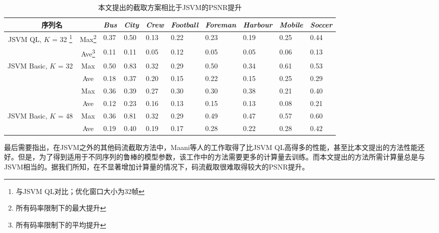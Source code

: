 \begin{table}[t]
	\centering
	\vspace{10pt}
	\caption{本文提出的截取方案相比于JSVM的PSNR提升}
	\label{tab:extraction-gain}
	\small
	\begin{minipage}{1.0\linewidth}
		\centering
		\begin{tabular}{c|c|*{3}{p{0.9cm}<{\centering}|}*{4}{p{1.1cm}<{\centering}|}p{0.9cm}<{\centering}}
			\hline \hline
			\multicolumn{2}{c|}{序列名} &
			{\em Bus} & {\em City} & {\em Crew} & {\em Football} & {\em Foreman} & {\em Harbour} & {\em Mobile} & {\em Soccer} \\ \hline 
			\multirow{2}{*}{JSVM QL, $K$ = 32 \footnote{\label{footnote:JSVM_QL} 与JSVM QL对比；优化窗口大小为32帧}}
			& Max\footnote{\label{footnote:max} 所有码率限制下的最大提升}
			& 0.37 & 0.50 & 0.13 & 0.22 & 0.23 & 0.19 & 0.25 & 0.44 \\ \cline{2-10}
			& Ave\footnote{\label{footnote:ave} 所有码率限制下的平均提升}
			& 0.11 & 0.11 & 0.05 & 0.12 & 0.05 & 0.05 & 0.06 & 0.13 \\ \hline
			\multirow{2}{*}{JSVM Basic, $K$ = 32}
			& Max & 0.50 & 0.83 & 0.32 & 0.29 & 0.50 & 0.34 & 0.61 & 0.53 \\ \cline{2-10}
			& Ave & 0.18 & 0.37 & 0.20 & 0.15 & 0.22 & 0.15 & 0.25 & 0.29 \\ \Xhline{2\arrayrulewidth}
			\multirow{2}{*}{JSVM QL, $K$ = 48}
			& Max & 0.36 & 0.39 & 0.27 & 0.30 & 0.30 & 0.38 & 0.21 & 0.40 \\ \cline{2-10}
			& Ave & 0.12 & 0.23 & 0.16 & 0.13 & 0.15 & 0.13 & 0.08 & 0.21 \\ \hline
			\multirow{2}{*}{JSVM Basic, $K$ = 48}
			& Max & 0.36 & 0.81 & 0.32 & 0.29 & 0.49 & 0.47 & 0.57 & 0.60 \\ \cline{2-10}
			& Ave & 0.19 & 0.40 & 0.19 & 0.17 & 0.28 & 0.22 & 0.28 & 0.42 \\ \hline
		\end{tabular}
	\end{minipage}
\end{table}

最后需要指出，在JSVM之外的其他码流截取方法中，Maani等人的工作\supercite{Maani2009}取得了比JSVM QL高得多的性能，甚至比本文提出的方法性能还好。但是，为了得到适用于不同序列的鲁棒的模型参数，该工作中的方法需要更多的计算量去训练。而本文提出的方法所需计算量总是与JSVM相当的。据我们所知，在不显著增加计算量的情况下，码流截取很难取得较大的PSNR提升。

